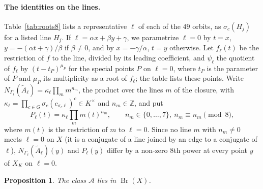 \documentclass[11pt]{article}
\newtheorem{proposition}[theorem]{Proposition}
\newcommand{\Z}{\mathbb{Z}}
\newcommand{\Br}{\operatorname{Br}}
\begin{document}
\paragraph{The identities on the lines.} Table~\ref{tab:roots8} lists a representative $\ell$ of each of the $49$ orbits, as $\sigma_c(H_j)$ for a listed line $H_j$. If $\ell=\alpha x+\beta y+\gamma$, we parametrize $\ell=0$ by $t=x$, $y=-(\alpha t+\gamma)/\beta$ if $\beta\neq0$, and by $x=-\gamma/\alpha$, $t=y$ otherwise. Let $f_\ell(t)$ be the restriction of $f$ to the line, divided by its leading coefficient, and $\psi_\ell$ the quotient of $f_\ell$ by $(t-t_P)^{\mu_P}$ for the special points $P$ on $\ell=0$, where $t_P$ is the parameter of $P$ and $\mu_P$ its multiplicity as a root of $f_\ell$; the table lists these points. Write $N_{\Gamma_\ell}(\tilde A_\ell)=\kappa_\ell\prod_mm^{n_m}$, the product over the lines $m$ of the closure, with $\kappa_\ell=\prod_{c\in G}\sigma_c(c_{\sigma_c\ell})^c\in K^\times$ and $n_m\in\Z$, and put
\[
P_\ell(t)=\kappa_\ell\prod_mm(t)^{\bar n_m},\qquad \bar n_m\in\{0,\dots,7\},\ \bar n_m\equiv n_m\pmod 8,
\]
where $m(t)$ is the restriction of $m$ to $\ell=0$. Since no line $m$ with $n_m\neq0$ meets $\ell=0$ on $X$ (it is a conjugate of a line joined by an edge to a conjugate of $\ell$), $N_{\Gamma_\ell}(\tilde A_\ell)(y)$ and $P_\ell(y)$ differ by a non-zero $8$th power at every point $y$ of $X_K$ on $\ell=0$.

\begin{proposition}\label{prop:unram}
The class $\mathcal A$ lies in $\Br(X)$.
\end{proposition}
\end{document}
